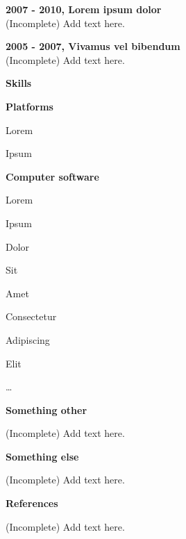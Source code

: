 \documentclass[a4paper,12pt,final]{memoir}
\newcommand{\Sep}{\vspace{1.5em}}
\newcommand{\SmallSep}{\vspace{0.5em}}
\newcommand{\CVSection}[1]
	{\Large\textbf{#1}\par
	\SmallSep\normalsize\normalfont}
\newcommand{\CVItem}[1]
	{\textbf{\color{RoyalBlue} #1}}
\begin{document}
\CVItem{2007 - 2010, Lorem ipsum dolor}\\
(Incomplete) Add text here.
\SmallSep

\CVItem{2005 - 2007, Vivamus vel bibendum}\\
(Incomplete) Add text here.
\Sep

\CVSection{Skills}
\CVItem{Platforms}
\begin{multicols}{3}
\begin{compactitem}[\color{RoyalBlue}$\circ$]
	\item Lorem 
	\item Ipsum 
\end{compactitem}
\end{multicols}
\SmallSep

\CVItem{Computer software}
\begin{multicols}{3}
\begin{compactitem}[\color{RoyalBlue}$\circ$]
	\item Lorem 
	\item Ipsum 
	\item Dolor 
	\item Sit 
	\item Amet
	\item Consectetur 
	\item Adipiscing 
	\item Elit
	\item \ldots
\end{compactitem}
\end{multicols}
\Sep 

\CVSection{Something other}
(Incomplete) Add text here.

\clearpage
\framebreak
\framebreak

\CVSection{Something else}
(Incomplete) Add text here.
\Sep

\CVSection{References}
(Incomplete) Add text here.

\end{document}
